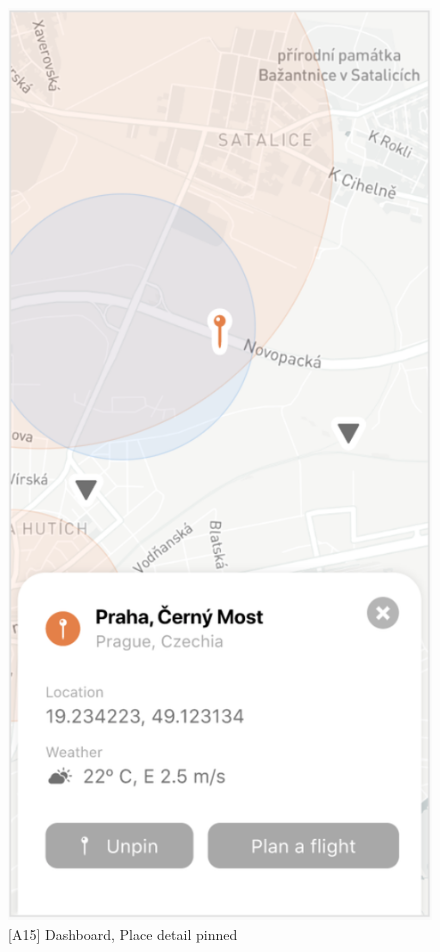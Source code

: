 \begin{figure}
\begin{minipage}{.45\textwidth}
        \includegraphics[width=.7\linewidth]{assets/user_interface_design/dashboard/dashboard_place_detail_pinned.png}
        \caption{[A15] Dashboard, Place detail pinned}
        \label{fig:dashboard_place_detail_pinned}
    \end{minipage}
    \label{fig:dashboard_place_detail_all}
\end{figure}

